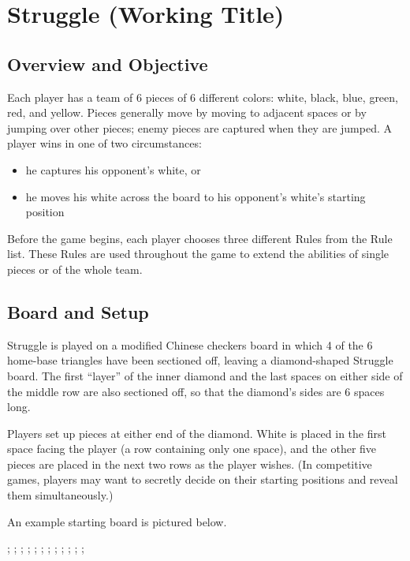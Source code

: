 \documentclass[../rulebook.tex]{subfiles}
\begin{document}
\section*{Struggle (Working Title)}
\subsection*{Overview and Objective}
Each player has a team of 6 pieces of 6 different colors:
white, black, blue, green, red, and yellow.
Pieces generally move by moving to adjacent spaces or by jumping over other pieces;
enemy pieces are captured when they are jumped.
A player wins in one of two circumstances:
\begin{itemize}\itemsep0pt
\item he captures his opponent's white, or 
\item he moves his white across the board to his opponent's white's starting position
\end{itemize}

Before the game begins, each player chooses three different Rules
from the Rule list.
These Rules are used throughout the game to extend the abilities
of single pieces or of the whole team.

\subsection*{Board and Setup}
Struggle is played on a modified Chinese checkers board in which 4 of the 6 home-base triangles have been sectioned off, leaving a diamond-shaped Struggle board.  The first “layer” of the inner diamond and the last spaces on either side of the middle row are also sectioned off, so that the diamond's sides are 6 spaces long.


Players set up pieces at either end of the diamond.
White is placed in the first space facing the player
(a row containing only one space),
and the other five pieces are placed in the next two rows
as the player wishes. (In competitive games, players may want to secretly
decide on their starting positions and reveal them simultaneously.)

An example starting board is pictured below.

\begin{center}
\begin{struggleboard}
  ;
  ;
  ;
  ;
  ;
  ;
  ;
  ;
  ;
  ;
  ;
  ;
\end{struggleboard}
\end{center}
\end{document}
